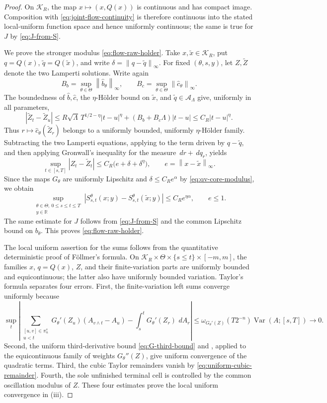 \documentclass[11pt,reqno]{amsart}
\theoremstyle{plain}
\theoremstyle{definition}
\newcommand{\R}{\mathbb R}
\newcommand{\cK}{\mathcal K}
\newcommand{\dd}{\,d}
\newcommand{\Var}{\operatorname{Var}}
\newcommand{\norm}[1]{\left\lVert #1\right\rVert}
\newcommand{\abs}[1]{\left\lvert #1\right\rvert}
\begin{document}
\begin{proof}
On \(\cK_R\), the map
\(x\mapsto(x,Q(x))\) is continuous and has compact image.  Composition with
\eqref{eq:joint-flow-continuity} is therefore continuous into the stated
local-uniform function space and hence uniformly continuous; the same is
true for \(J\) by \eqref{eq:J-from-S}.

We prove the stronger modulus \eqref{eq:flow-raw-holder}.  Take
\(x,\widetilde x\in\cK_R\), put
\(q=Q(x)\), \(\widetilde q=Q(\widetilde x)\), and write
\(\delta=\norm{q-\widetilde q}_\infty\).  For fixed
\((\theta,s,y)\), let \(Z,\widetilde Z\) denote the two Lamperti solutions.
Write again
\[
  B_b=\sup_{\theta\in\Theta}\norm{\widehat b_\theta}_\infty,
  \qquad
  B_c=\sup_{\theta\in\Theta}\norm{\widehat c_\theta}_\infty.
\]
The boundedness of \(\widehat b,\widehat c\), the \(\eta\)-H\"older bound on
\(\widetilde x\), and \(\widetilde q\in\mathcal A_\Lambda\) give, uniformly
in all parameters,
\[
  \abs{\widetilde Z_t-\widetilde Z_u}
  \le R\sqrt\Lambda\,T^{1/2-\eta}\abs{t-u}^\eta
      +(B_b+B_c\Lambda)\abs{t-u}
  \le C_R\abs{t-u}^\eta.
\]
Thus \(r\mapsto\widehat c_\theta(\widetilde Z_r)\) belongs to a uniformly
bounded, uniformly \(\eta\)-H\"older family.  Subtracting the two Lamperti
equations, applying  to the term driven by
\(q-\widetilde q\), and then applying Gronwall's inequality for the measure
\(\dd r+\dd q_r\), yields
\[
  \sup_{t\in[s,T]}\abs{Z_t-\widetilde Z_t}
  \le C_R\bigl(e+\delta+\delta^\eta\bigr),
  \qquad e=\norm{x-\widetilde x}_\infty.
\]
Since the maps \(G_\theta\) are uniformly Lipschitz and
\(\delta\le C_Re^\alpha\) by \eqref{eq:qv-core-modulus}, we obtain
\[
  \sup_{\substack{\theta\in\Theta,\ 0\le s\le t\le T\\y\in\R}}
  \abs{S_{s,t}^\theta(x;y)-S_{s,t}^\theta(\widetilde x;y)}
  \le C_Re^{\eta\alpha},
  \qquad e\le1.
\]
The same estimate for \(J\) follows from \eqref{eq:J-from-S} and the common
Lipschitz bound on \(b_\theta\).  This proves \eqref{eq:flow-raw-holder}.

The local uniform assertion for the sums follows
from the quantitative deterministic proof of F\"ollmer's formula.  On
\(\cK_R\times\Theta\times\{s\le t\}\times[-m,m]\), the families \(x\),
\(q=Q(x)\), \(Z\), and their finite-variation parts are uniformly bounded
and equicontinuous; the latter also have uniformly bounded variation.
Taylor's formula separates four errors.  First, the finite-variation left
sums converge uniformly because
\[
  \sup_t\left|
    \sum_{\substack{[u,v]\in\pi_n^s\\u<t}}
      G_\theta'(Z_u)(A_{v\wedge t}-A_u)
    -\int_s^tG_\theta'(Z_r)\,\dd A_r
  \right|
  \le
  \omega_{G_\theta'(Z)}(T2^{-n})\Var(A;[s,T])
  \longrightarrow0.
\]
Second, the uniform third-derivative bound
\eqref{eq:G-third-bound} and
, applied to the equicontinuous family of
weights \(G_\theta''(Z)\), give uniform convergence of the quadratic terms.
Third, the cubic Taylor remainders vanish by
\eqref{eq:uniform-cubic-remainder}.  Fourth, the sole unfinished terminal
cell is controlled by the common oscillation modulus of \(Z\).  These four
estimates prove the local uniform convergence in (iii).


\end{proof}
\end{document}
